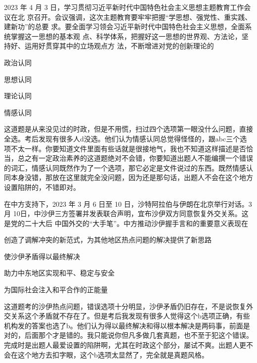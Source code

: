 \documentclass[lang=cn,newtx,10pt,scheme=chinese,pad,twocol]{zznote}
\begin{document}
\begin{exercise}2023 年 4 月 3 日，学习贯彻习近平新时代中国特色社会主义思想主题教育工作会议在北 京召开。会议强调，这次主题教育要牢牢把握“学思想、强党性、重实践、建新功”的总要 求。要全面学习领会习近平新时代中国特色社会主义思想，全面系统掌握这一思想的基本观 点、科学体系，把握好这一思想的世界观、方法论，坚持好、运用好贯穿其中的立场观点方 法，不断增进对党的创新理论的
	\begin{choice}
		\item 政治认同
		\item 思想认同
		\item 理论认同
		\item 情感认同
	\end{choice}
\end{exercise}
\begin{solution}
	这道题是从来没见过的时政，但是不用慌，扫过四个选项第一眼没什么问题，直接全选。考后发现有很多人d没选。他们认为情感认同总觉得怪怪的，跟abc三个选项不太一样。你要知道文件里面有些话就是很接地气，我也不知道这样描述是否恰当，总之有一定政治素养的这道题绝对不会错，你要知道出题人不能编撰一个错误的词汇，情感认同既然作为了一个选项，那它必定是文件说过的东西。既然情感认同本身没错，那放在这里就完全没问题，因为还是那句话，出题人不会在这个地方设置陷阱的，不错即对。
\end{solution}


\begin{exercise}在中方支持下，2023 年 3 月 6 日至 10 日，沙特阿拉伯与伊朗在北京举行对话。3 月 10日，中沙伊三方签署并发表联合声明，宜布沙伊双方同意恢复外交关系。这是党的二十大后 中国外交的“大手笔”。中方推动沙伊握手言和的重要意义表现在
	\begin{choice}
		\item 创造了调解冲突的新范式，为其他地区热点问题的解决提供了新思路
		\item 使沙伊矛盾得以最终解决
		\item 助力中东地区实现和平、稳定与安全
		\item 为国际社会注入和平合作的正能量
	\end{choice}
\end{exercise}
\begin{solution}
	这道题考的沙伊热点问题，错误选项十分明显，沙伊矛盾仍旧存在，不是说恢复外交关系这个矛盾就不存在了。但是考后我发现有很多人觉得这个b选项正确，有些机构发的答案也选了b。他们认为得以最终解决和得以根本解决是两码事，前面是对的，后面那个才是错的。我只能说你但凡多做几套真题，也不至于犯这个错误。完成时是出题人最爱设置的陷阱啊，尤其在时政这个部分，屡试不爽。出题人更不会在这个地方去扣字眼，这个b选项太显然了，完全就是真题风格。
\end{solution}
\end{document}
